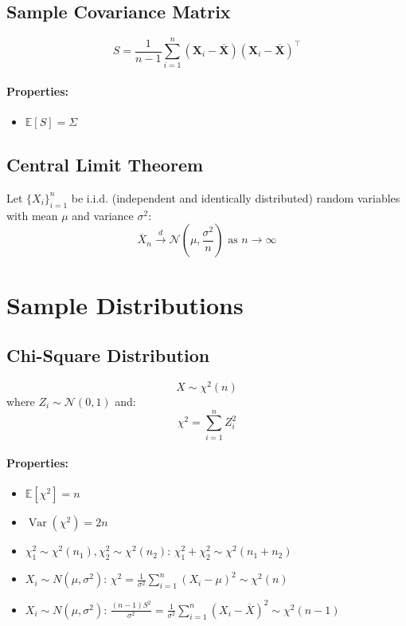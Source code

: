 \documentclass{article}
\begin{document}
\subsection{Sample Covariance Matrix}
\[
    S = \frac{1}{n-1}\sum_{i=1}^{n}(\mathbf{X}_i - \overline{\mathbf{X}})(\mathbf{X}_i - \overline{\mathbf{X}})^\top
\]
\paragraph{Properties:}
\begin{itemize}
    \item $\mathbb{E}[S] = \Sigma$
\end{itemize}

\subsection{Central Limit Theorem}

Let $\{X_i\}_{i=1}^{n}$ be i.i.d. (independent and identically distributed) random variables with mean $\mu$ and variance $\sigma^2$:
\[
    \overline{X}_n \overset{d}{\rightarrow} \mathcal{N}\left(\mu, \frac{\sigma^2}{n}\right) \text{ as } n \rightarrow \infty
\]


\newpage
\section{Sample Distributions}

\subsection{Chi-Square Distribution}
\[
    X \sim \chi^2(n)
\]
where $Z_i \sim \mathcal{N}(0,1)$ and:
\[
    \chi^2 = \sum_{i=1}^{n} Z_i^2
\]
\paragraph{Properties:}
\begin{itemize}
    \item $\mathbb{E}[\chi^2] = n$
    \item $\operatorname{Var}(\chi^2) = 2n$
    \item $\chi_1^2 \sim \chi^2(n_1), \chi_2^2 \sim \chi^2(n_2)$: $\chi_1^2 + \chi_2^2 \sim \chi^2(n_1 + n_2)$
    \item $X_i \sim N(\mu, \sigma^2)$: $\chi^2 = \frac{1}{\sigma^2}\sum_{i=1}^{n}(X_i - \mu)^2 \sim \chi^2(n)$
    \item $X_i \sim N(\mu, \sigma^2)$: $\frac{(n-1)S^2}{\sigma^2} = \frac{1}{\sigma^2}\sum_{i=1}^{n}(X_i - \overline{X})^2 \sim \chi^2(n-1)$
\end{itemize}
\end{document}
